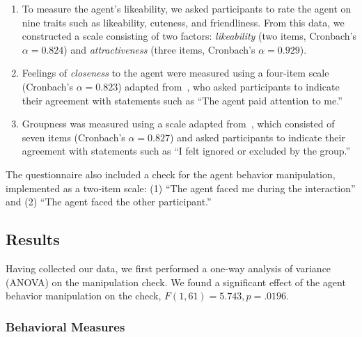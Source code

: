 \begin{enumerate}
\item To measure the agent's likeability, we asked participants to rate the agent on nine traits such as likeability, cuteness, and friendliness. From this data, we constructed a scale consisting of two factors: \emph{likeability} (two items, Cronbach's $\alpha = 0.824$) and \emph{attractiveness} (three items, Cronbach's $\alpha = 0.929$).
\item Feelings of \emph{closeness} to the agent were measured using a four-item scale (Cronbach's $\alpha = 0.823$) adapted from~\citet{aron1992inclusion}, who asked participants to indicate their agreement with statements such as ``The agent paid attention to me.''
\item Groupness was measured using a scale adapted from~\citet{williams2000cyberostracism}, which consisted of seven items (Cronbach's $\alpha = 0.827$) and asked participants to indicate their agreement with statements such as ``I felt ignored or excluded by the group.''
\end{enumerate}

The questionnaire also included a check for the agent behavior manipulation, implemented as a two-item scale: (1) ``The agent faced me during the interaction'' and (2) ``The agent faced the other participant.''

\subsection{Results}

Having collected our data, we first performed a one-way analysis of variance (ANOVA) on the manipulation check. We found a significant effect of the agent behavior manipulation on the check, $F(1, 61) = 5.743, p = .0196$.

\subsubsection{Behavioral Measures}

